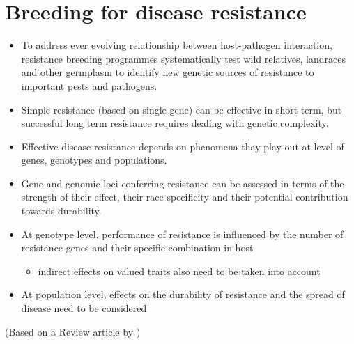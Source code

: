 \documentclass[11pt,dvipsnames,ignorenonframetext,aspectratio=169]{beamer}
\providecommand{\tightlist}{%
  \setlength{\itemsep}{0pt}\setlength{\parskip}{0pt}}
\begin{document}
\hypertarget{breeding-for-disease-resistance}{%
\section{Breeding for disease
resistance}\label{breeding-for-disease-resistance}}

\begin{frame}{}
\protect\hypertarget{section-20}{}
\small

\begin{itemize}
\tightlist
\item
  To address ever evolving relationship between host-pathogen
  interaction, resistance breeding programmes systematically test wild
  relatives, landraces and other germplasm to identify new genetic
  sources of resistance to important pests and pathogens.
\item
  Simple resistance (based on single gene) can be effective in short
  term, but successful long term resistance requires dealing with
  genetic complexity.
\item
  Effective disease resistance depends on phenomena thay play out at
  level of genes, genotypes and populations.
\item
  Gene and genomic loci conferring resistance can be assessed in terms
  of the strength of their effect, their race specificity and their
  potential contribution towards durability.
\item
  At genotype level, performance of resistance is influenced by the
  number of resistance genes and their specific combination in host

  \begin{itemize}
  \tightlist
  \item
    indirect effects on valued traits also need to be taken into account
  \end{itemize}
\item
  At population level, effects on the durability of resistance and the
  spread of disease need to be considered
\end{itemize}

(\footnotesize Based on a Review article by
\citet{nelson2018navigating})
\end{frame}
\end{document}
